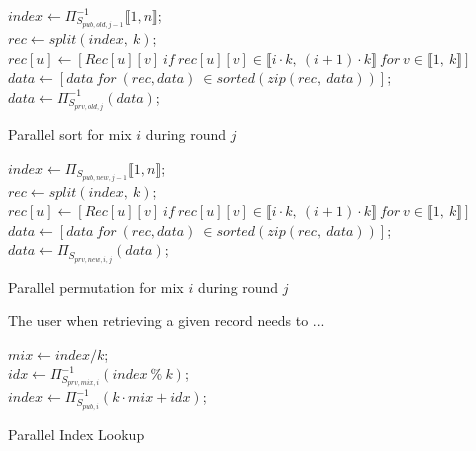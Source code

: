 \documentclass[USenglish,oneside,twocolumn]{article}
\begin{document}
\begin{algorithm}
\DontPrintSemicolon
{}
$index \gets {\Pi}^{-1}_{S_{pub,old,j-1}} \llbracket 1, n\rrbracket $;\\
$rec \gets split(index,\ k)$;\\
{
	$rec[u] \gets [Rec[u][v]\ if\ rec[u][v] \in \llbracket i\cdot k,\ (i+1) \cdot k \rrbracket\ for\  v \in \llbracket 1,\ k \rrbracket]$
}
$data \gets [data\ for\ (rec,data)\ \in sorted(zip(rec,\ data))]$;\\
$data \gets \Pi^{-1}_{S_{prv,old,j}} \left ( data \right )$;\\
\caption{Parallel sort for mix $i$ during round $j$}
\label{alg:SortIN}
\end{algorithm}

\begin{algorithm}
\DontPrintSemicolon
{}
$index \gets {\Pi}_{S_{pub,new,j-1}} \llbracket 1,n \rrbracket$;\\
$rec \gets split(index,\ k)$;\\
{
	$rec[u] \gets [Rec[u][v]\ if\ rec[u][v] \in \llbracket i\cdot k,\ (i+1) \cdot k \rrbracket\ for\  v \in \llbracket 1,\ k \rrbracket]$
}
$data \gets [data\ for\ (rec,data)\ \in sorted(zip(rec,\ data))]$;\\
$data \gets \Pi_{S_{prv,new,i,j}}\left ( data \right )$;\\
\caption{Parallel permutation for mix $i$ during round $j$}
\label{alg:SortOUT}
\end{algorithm}

The user when retrieving a given record needs to ...

\begin{algorithm}
\DontPrintSemicolon
{}
{
	$mix \gets index / k $;\\
	$idx \gets {\Pi}^{-1}_{S_{prv, mix, i}}(index\ \%\ k) $;\\
	$index \gets {\Pi}^{-1}_{S_{pub, i}}(k\cdot mix + idx)$;\\

}
\caption{Parallel Index Lookup}
\label{alg:PIL}
\end{algorithm}
\end{document}
